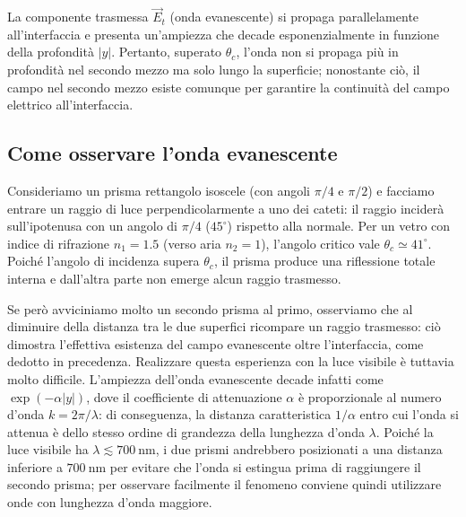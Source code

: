 \documentclass[openany,a4paper,12pt]{book}
\begin{document}
\begin{nota}
    La componente trasmessa $\vec{E}_t$ (onda evanescente) si propaga parallelamente all'interfaccia e presenta un'ampiezza che decade esponenzialmente in funzione della profondità $|y|$. Pertanto, superato $\theta_c$, l'onda non si propaga più in profondità nel secondo mezzo ma solo lungo la superficie; nonostante ciò, il campo nel secondo mezzo esiste comunque per garantire la continuità del campo elettrico all'interfaccia.
\end{nota}



\subsection*{Come osservare l'onda evanescente}

Consideriamo un prisma rettangolo isoscele (con angoli $\pi/4$ e $\pi/2$) e facciamo entrare un raggio di luce perpendicolarmente a uno dei cateti: il raggio inciderà sull'ipotenusa con un angolo di $\pi/4$ ($45^\circ$) rispetto alla normale.
Per un vetro con indice di rifrazione $n_1 = \num{1.5}$ (verso aria $n_2 = 1$), l'angolo critico vale $\theta_c \simeq 41^\circ$. Poiché l'angolo di incidenza supera $\theta_c$, il prisma produce una riflessione totale interna e dall'altra parte non emerge alcun raggio trasmesso.

Se però avviciniamo molto un secondo prisma al primo, osserviamo che al diminuire della distanza tra le due superfici ricompare un raggio trasmesso: ciò dimostra l'effettiva esistenza del campo evanescente oltre l'interfaccia, come dedotto in precedenza.
Realizzare questa esperienza con la luce visibile è tuttavia molto difficile. L'ampiezza dell'onda evanescente decade infatti come $\exp(-\alpha |y|)$, dove il coefficiente di attenuazione $\alpha$ è proporzionale al numero d'onda $k = 2\pi/\lambda$: di conseguenza, la distanza caratteristica $1/\alpha$ entro cui l'onda si attenua è dello stesso ordine di grandezza della lunghezza d'onda $\lambda$. Poiché la luce visibile ha $\lambda \lesssim \SI{700}{\nano\meter}$, i due prismi andrebbero posizionati a una distanza inferiore a $\SI{700}{\nano\meter}$ per evitare che l'onda si estingua prima di raggiungere il secondo prisma; per osservare facilmente il fenomeno conviene quindi utilizzare onde con lunghezza d'onda maggiore.
\end{document}

